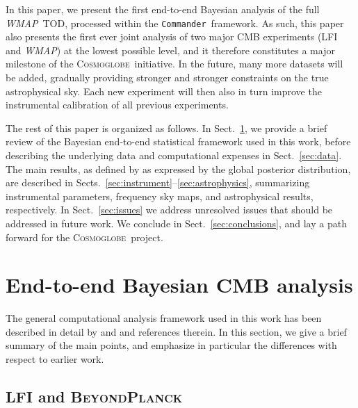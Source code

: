 \documentclass[twocolumn]{../../common/aa}
\def\WMAP{\emph{WMAP}}
\def\commander{\texttt{Commander}}
\newcommand{\bp}{\textsc{BeyondPlanck}}
\newcommand{\cosmoglobe}{\textsc{Cosmoglobe}}
\begin{document}
In this paper, we present the first end-to-end Bayesian analysis of the full \WMAP\ TOD, processed within the \commander\ framework. As such, this paper also presents the first ever joint analysis of two major CMB experiments (LFI and \WMAP) at the lowest possible level, and it therefore constitutes a major milestone of the \cosmoglobe\ initiative. In the future, many more datasets will be added, gradually providing stronger and stronger constraints on the true astrophysical sky. Each new experiment will then also in turn improve the instrumental calibration of all previous experiments. 

The rest of this paper is organized as follows. In Sect.~\ref{sec:methods}, we provide a brief review of the Bayesian end-to-end statistical framework used in this work, before describing the underlying data and computational expenses in Sect.~\ref{sec:data}. The main results, as defined by as expressed by the global posterior distribution, are described in Sects.~\ref{sec:instrument}--\ref{sec:astrophysics}, summarizing instrumental parameters, frequency sky maps, and astrophysical results, respectively. In Sect.~\ref{sec:issues} we address unresolved issues that should be addressed in future work. We conclude in Sect.~\ref{sec:conclusions}, and lay a path forward for the \cosmoglobe\ project.

\section{End-to-end Bayesian CMB analysis}
\label{sec:methods}

The general computational analysis framework used in this work has been described in detail by \citet{bp01} and \citet{bp17} and references therein. In this section, we give a brief summary of the main points, and emphasize in particular the differences with respect to earlier work. 

\subsection{LFI and \bp}
\label{sec:lfi_bp}
\end{document}
